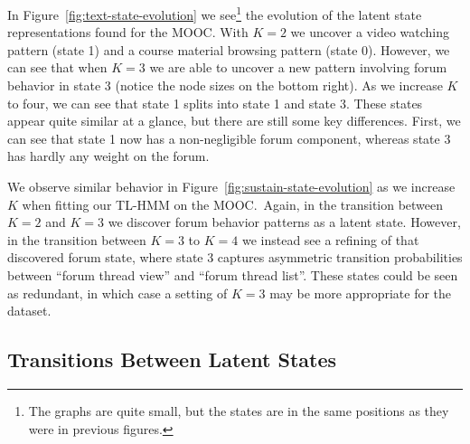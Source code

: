 In Figure~\ref{fig:text-state-evolution} we see\footnote{The graphs are
quite small, but the states are in the same positions as they were in
previous figures.} the evolution of the latent state
representations found for the \textretrieval{} MOOC.  With $K=2$ we uncover
a video watching pattern (state 1) and a course material browsing pattern
(state 0). However, we can see that when $K=3$ we are able to uncover a new
pattern involving forum behavior in state 3 (notice the node sizes on the
bottom right). As we increase $K$ to four, we can see that state 1 splits
into state 1 and state 3. These states appear quite similar at a glance,
but there are still some key differences. First, we can see that state 1
now has a non-negligible forum component, whereas state 3 has hardly any
weight on the forum.

We observe similar behavior in Figure~\ref{fig:sustain-state-evolution}
as we increase $K$ when fitting our TL-HMM on the \sustain{} MOOC.\ Again,
in the transition between $K=2$ and $K=3$ we discover forum behavior
patterns as a latent state. However, in the transition between $K=3$ to
$K=4$ we instead see a refining of that discovered forum state, where
state 3 captures asymmetric transition probabilities between ``forum thread
view'' and ``forum thread list''. These states could be seen as redundant,
in which case a  setting of $K=3$ may be more appropriate for the
\sustain{} dataset.

\subsection{Transitions Between Latent States}

